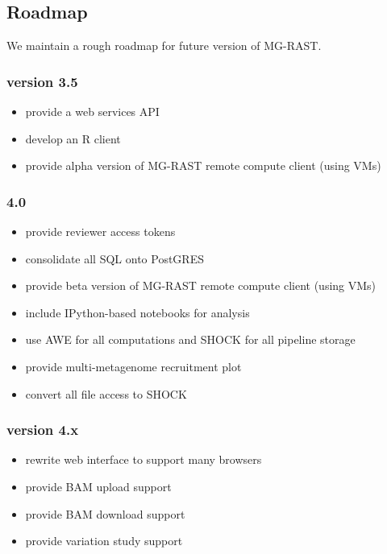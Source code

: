 \documentclass[12pt,fullpage]{report}
\begin{document}
\subsection{Roadmap}
We maintain a rough roadmap for future version of MG-RAST.
\subsubsection*{version 3.5}
\begin{itemize}
\item provide  a web services API
\item develop an R client
\item provide alpha version of MG-RAST remote compute client (using VMs)
\end{itemize}
\subsubsection*{4.0}
\begin{itemize}
\item provide reviewer access tokens
\item consolidate all SQL onto PostGRES
\item provide beta version of MG-RAST remote compute client (using VMs)
\item include IPython-based notebooks for analysis
\item use AWE for all computations and SHOCK for all pipeline storage
\item provide multi-metagenome recruitment plot
\item convert all file access to SHOCK
\end{itemize}
\subsubsection*{version 4.x}
\begin{itemize}
\item rewrite web interface to support many browsers
\item provide BAM upload support
\item provide BAM download support
\item provide variation study support
\end{itemize}
\end{document}
